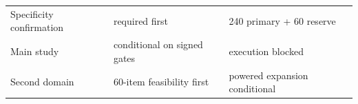 \begin{tabular}{lll}
Specificity confirmation & required first & 240 primary + 60 reserve \\
Main study & conditional on signed gates & execution blocked \\
Second domain & 60-item feasibility first & powered expansion conditional \\
\end{tabular}
